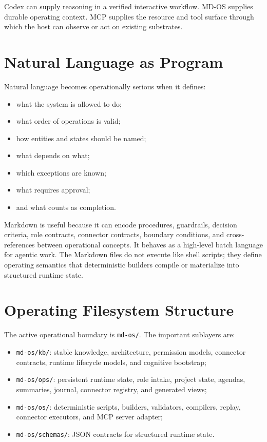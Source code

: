 \documentclass[11pt,a4paper]{article}
\newcommand{\code}[1]{\texttt{#1}}
\begin{document}
Codex can supply reasoning in a verified interactive workflow. MD-OS supplies durable
operating context. MCP supplies the resource and tool surface through which the
host can observe or act on existing substrates.

\section{Natural Language as Program}

Natural language becomes operationally serious when it defines:

\begin{itemize}
  \item what the system is allowed to do;
  \item what order of operations is valid;
  \item how entities and states should be named;
  \item what depends on what;
  \item which exceptions are known;
  \item what requires approval;
  \item and what counts as completion.
\end{itemize}

Markdown is useful because it can encode procedures, guardrails, decision
criteria, role contracts, connector contracts, boundary conditions, and
cross-references between operational concepts. It behaves as a high-level
batch language for agentic work. The Markdown files do not execute like shell
scripts; they define operating semantics that deterministic builders compile
or materialize into structured runtime state.

\section{Operating Filesystem Structure}

The active operational boundary is \code{md-os/}. The important sublayers are:

\begin{itemize}
  \item \code{md-os/kb/}: stable knowledge, architecture, permission models,
  connector contracts, runtime lifecycle models, and cognitive bootstrap;
  \item \code{md-os/ops/}: persistent runtime state, role intake, project state,
  agendas, summaries, journal, connector registry, and generated views;
  \item \code{md-os/os/}: deterministic scripts, builders, validators, compilers,
  replay, connector executors, and MCP server adapter;
  \item \code{md-os/schemas/}: JSON contracts for structured runtime state.
\end{itemize}
\end{document}
